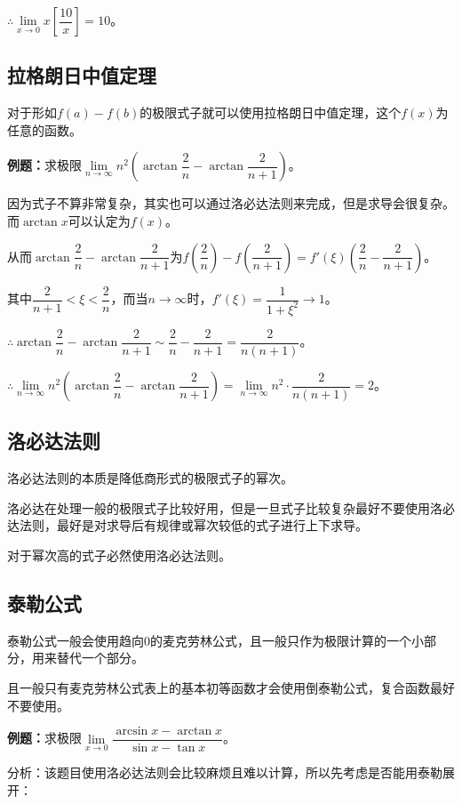 $\therefore \lim\limits_{x\to 0}x\left[\dfrac{10}{x}\right]=10$。

\subsection{拉格朗日中值定理}

对于形如$f(a)-f(b)$的极限式子就可以使用拉格朗日中值定理，这个$f(x)$为任意的函数。

\textbf{例题：}求极限$\lim\limits_{n\to\infty}n^2\left(\arctan\dfrac{2}{n}-\arctan\dfrac{2}{n+1}\right)$。\medskip

因为式子不算非常复杂，其实也可以通过洛必达法则来完成，但是求导会很复杂。而$\arctan x$可以认定为$f(x)$。

从而$\arctan\dfrac{2}{n}-\arctan\dfrac{2}{n+1}$为$f(\dfrac{2}{n})-f(\dfrac{2}{n+1})=f'(\xi)\left(\dfrac{2}{n}-\dfrac{2}{n+1}\right)$。

其中$\dfrac{2}{n+1}<\xi<\dfrac{2}{n}$，而当$n\to\infty$时，$f'(\xi)=\dfrac{1}{1+\xi^2}\to 1$。

$\therefore\arctan\dfrac{2}{n}-\arctan\dfrac{2}{n+1}\sim\dfrac{2}{n}-\dfrac{2}{n+1}=\dfrac{2}{n(n+1)}$。

$\therefore\lim\limits_{n\to\infty}n^2\left(\arctan\dfrac{2}{n}-\arctan\dfrac{2}{n+1}\right)=\lim\limits_{n\to\infty}n^2\cdot\dfrac{2}{n(n+1)}=2$。

\subsection{洛必达法则}

洛必达法则的本质是降低商形式的极限式子的幂次。

洛必达在处理一般的极限式子比较好用，但是一旦式子比较复杂最好不要使用洛必达法则，最好是对求导后有规律或幂次较低的式子进行上下求导。

对于幂次高的式子必然使用洛必达法则。

\subsection{泰勒公式}

泰勒公式一般会使用趋向0的麦克劳林公式，且一般只作为极限计算的一个小部分，用来替代一个部分。

且一般只有麦克劳林公式表上的基本初等函数才会使用倒泰勒公式，复合函数最好不要使用。

\textbf{例题：}求极限$\lim\limits_{x\to 0}\dfrac{\arcsin x-\arctan x}{\sin x-\tan x}$。\medskip

分析：该题目使用洛必达法则会比较麻烦且难以计算，所以先考虑是否能用泰勒展开：

